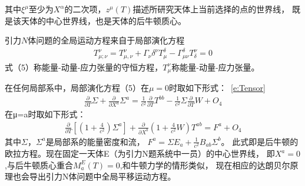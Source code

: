 \documentclass{ctexart}
\begin{document}
其中$\xi^\mu$至少为$X^\alpha$的二次项，$z^\mu(T)$描述所研究天体上当前选择的点的世界线，
既是该天体的中心世界线，也是天体的后牛顿质心。
\par 引力$N$体问题的全局运动方程来自于局部演化方程
\begin{equation}\label{e:Tensor}
  \begin{aligned}
   T_{\mu;\nu}^\nu=T_{\mu,\nu}^\nu+Γ_\nu\delta^\nu T_\mu^\delta-\Gamma_{\mu\nu}^\delta T_\delta^\nu=0
  \end{aligned}
\end{equation}
式（5）称能量-动量-应力张量的守恒方程，$T_\mu^\nu$称能量-动量-应力张量。
\par 在任何局部系中，局部演化方程（5）在$\mu=0$时取如下形式：~\ref{e:Tensor}
\begin{equation}
  \begin{aligned}
  \frac{\partial}{\partial T} \Sigma + \frac{\partial}{\partial X^a } \Sigma ^a
  =\frac{1}{c^2} \frac{\partial }{\partial T}T^{bb}
  -\frac{1}{c^2} \Sigma \frac{\partial}{\partial T} W+O_4
  \end{aligned}
\end{equation}
在μ=a时取如下形式：
\begin{equation}
  \begin{aligned}
  \frac{\partial}{\partial T} [(1+\frac{4}{c^2}) \Sigma ^a]+
  \frac{\partial}{\partial X^b } (1+\frac{4}{c^2}  W) T^{ab}=F^a+O_4
  \end{aligned}
\end{equation}
其中$\Sigma$，$\Sigma^a$是局部系的能量密度和流，
$F^a=\Sigma E_a+\frac{1}{c^2}  B_{ab} \Sigma^b$。
此式即是后牛顿的欧拉方程。现在固定一天体E（为引力N题系统中一员）的中心世界线，
即$X^a=0$,与后牛顿质心重合$M_a^E (T)=0$,和牛顿力学的情形类似，
现在相应的达朗贝尔原理也会导出引力N体问题中全局平移运动方程。
\end{document}
